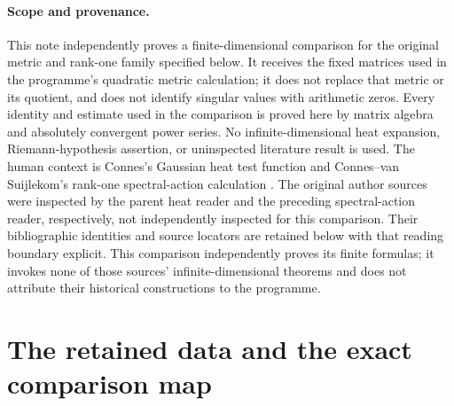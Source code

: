 \documentclass[11pt]{article}
\begin{document}
\paragraph{Scope and provenance.}
This note independently proves a finite-dimensional comparison for the original
metric and rank-one family specified below. It receives the fixed matrices used
in the programme's quadratic metric calculation; it does not replace that metric
or its quotient, and does not identify singular values with arithmetic zeros.
Every identity and estimate used in the comparison is proved here by matrix
algebra and absolutely convergent power series. No infinite-dimensional heat
expansion, Riemann-hypothesis assertion, or uninspected literature result is used.
The human context is Connes's Gaussian heat test function \cite{nhm:ConnesHeat}
and Connes--van Suijlekom's rank-one spectral-action calculation
\cite{nhm:ConnesSuijlekom}. The original author sources were inspected by the parent
heat reader and the preceding spectral-action reader, respectively, not
independently inspected for this comparison. Their bibliographic identities
and source locators are retained below with that reading boundary explicit.
This comparison independently proves its finite formulas; it invokes none of
those sources' infinite-dimensional theorems and does not attribute their
historical constructions to the programme.

\section{The retained data and the exact comparison map}
\end{document}
